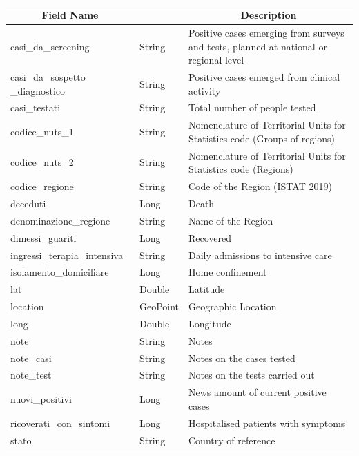 \documentclass[a4paper,12pt]{article}
\begin{document}
\paragraph{}
\begin{center}
\begin{tabular}{|m{45mm}|>{\raggedright}m{16mm}|m{75mm}|}
\hline
\multicolumn{1}{|c|}{\textbf{ Field Name }}
& \multicolumn{1}{c|}{\textbf{ Data Type }} 
    	& \multicolumn{1}{c|}{\textbf{ Description }}\\
\hline
casi\_da\_screening & String & Positive cases emerging from surveys and tests, planned at national or regional level \\
\hline
casi\_da\_sospetto \_diagnostico & String & Positive cases emerged from clinical activity \\
\hline
casi\_testati & String & Total number of people tested \\
\hline
codice\_nuts\_1 & String & Nomenclature of Territorial Units for Statistics code (Groups of regions) \\
\hline
codice\_nuts\_2 & String & Nomenclature of Territorial Units for Statistics code (Regions) \\
\hline
codice\_regione & String & Code of the Region (ISTAT 2019) \\
\hline
deceduti & Long & Death \\
\hline
denominazione\_regione & String & Name of the Region \\
\hline
dimessi\_guariti & Long & Recovered \\
\hline
ingressi\_terapia\_intensiva & String & Daily admissions to intensive care \\
\hline
isolamento\_domiciliare & Long & Home confinement \\
\hline
lat & Double & Latitude \\
\hline
location & GeoPoint & Geographic Location \\
\hline
long & Double & Longitude \\
\hline
note & String & Notes \\
\hline
note\_casi & String & Notes on the cases tested \\
\hline
note\_test & String & Notes on the tests carried out \\
\hline
nuovi\_positivi & Long & News amount of current positive cases \\
\hline
ricoverati\_con\_sintomi & Long & Hospitalised patients with symptoms \\
\hline
stato & String & Country of reference \\

\end{tabular}
\end{center}
\end{document}
